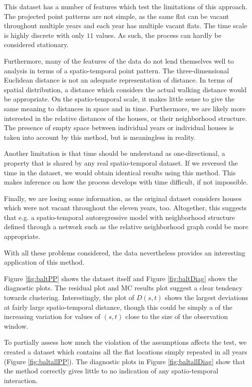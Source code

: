 \documentclass{article}
\begin{document}
This dataset has a number of features which test the limitations of this approach. The projected point patterns are not simple, as the same flat can be vacant throughout multiple years and each year has multiple vacant flats. The time scale is highly discrete with only $11$ values. As such, the process can hardly be considered stationary. 

Furthermore, many of the features of the data do not lend themselves well to analysis in terms of a spatio-temporal point pattern. The three-dimensional Euclidean distance is not an adequate representation of distance. In terms of spatial distribution, a distance which considers the actual walking distance would be appropriate. On the spatio-temporal scale, it makes little sense to give the same meaning to distances in space and in time. Furthermore, we are likely more interested in the relative distances of the houses, or their neighborhood structure. The presence of empty space between individual years or individual houses is taken into account by this method, but is meaningless in reality. 

Another limitation is that time should be understand as one-directional, a property that is shared by any real spatio-temporal dataset. If we reversed the time in the dataset, we would obtain identical results using this method. This makes inference on how the process develops with time difficult, if not impossible.

Finally, we are losing some information, as the original dataset considers houses which were not vacant throughout the eleven years, too. Altogether, this suggests that e.g. a spatio-temporal autoregressive model with neighborhood structure defined through a network such as the relative neighborhood graph could be more appropriate.

With all these problems considered, the data nevertheless provides an interesting application of this method. \newline

Figure \ref{fig:baltPP} shows the dataset itself and Figure \ref{fig:baltDiag} shows the diagnostic plots. The residual plot and MC results plot suggest a clear tendency towards clustering. Interestingly, the plot of $D(s,t)$ shows the largest deviations at fairly large spatio-temporal distance, though this could be simply a of the increasing variation for values of $(s,t)$ close to the size of the observation window. 


To partially assess how much the violation of the assumptions affects the test, we created a dataset which contains all the flat locations simply repeated in all years (Figure \ref{fig:baltallPP}). The diagnostic plots in Figure \ref{fig:baltallDiag} show that the method correctly gives little to no indication of any spatio-temporal interaction.
\end{document}
